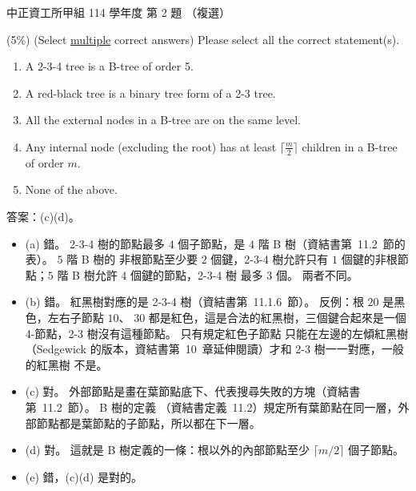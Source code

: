 \begin{pastexam}[label={px:ccu-114-swa-02}]{中正資工所甲組 114 學年度 第 2 題}
（複選）

(5\%) (Select \underline{multiple} correct answers) Please select all the correct statement(s).
\begin{enumerate}[label=(\alph*)]
\item A 2-3-4 tree is a B-tree of order 5.
\item A red-black tree is a binary tree form of a 2-3 tree.
\item All the external nodes in a B-tree are on the same level.
\item Any internal node (excluding the root) has at least $\lceil \frac{m}{2}\rceil$ children in a B-tree
of order $m$.
\item None of the above.
\end{enumerate}
\end{pastexam}

\begin{pastsoln}
答案：(c)(d)。

\begin{itemize}
\item (a) 錯。 2-3-4 樹的節點最多 $4$ 個子節點，是 $4$ 階 B 樹（資結書第~11.2~節的表）。 $5$ 階 B 樹的
非根節點至少要 $2$ 個鍵，2-3-4 樹允許只有 $1$ 個鍵的非根節點；$5$ 階 B 樹允許 $4$ 個鍵的節點，2-3-4 樹
最多 $3$ 個。 兩者不同。
\item (b) 錯。 紅黑樹對應的是 2-3-4 樹（資結書第~11.1.6~節）。 反例：根 $20$ 是黑色，左右子節點 $10$、
$30$ 都是紅色，這是合法的紅黑樹，三個鍵合起來是一個 4-節點，2-3 樹沒有這種節點。 只有規定紅色子節點
只能在左邊的左傾紅黑樹（Sedgewick 的版本，資結書第~10~章延伸閱讀）才和 2-3 樹一一對應，一般的紅黑樹
不是。
\item (c) 對。 外部節點是畫在葉節點底下、代表搜尋失敗的方塊（資結書第~11.2~節）。 B 樹的定義
（資結書定義~11.2）規定所有葉節點在同一層，外部節點都是葉節點的子節點，所以都在下一層。
\item (d) 對。 這就是 B 樹定義的一條：根以外的內部節點至少 $\lceil m/2 \rceil$ 個子節點。
\item (e) 錯，(c)(d) 是對的。
\end{itemize}
\end{pastsoln}
